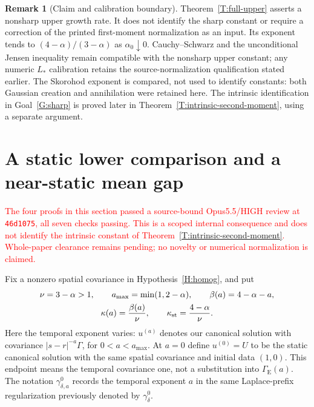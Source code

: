 \documentclass[12pt]{article}
\numberwithin{equation}{section}
\theoremstyle{definition}
\newtheorem{remark}[theorem]{Remark}
\newcommand{\myCmts}[1]{\begin{framed}\noindent\textcolor{red}{#1}\end{framed}}
\begin{document}
\begin{remark}[Claim and calibration boundary]\label{R:full-upper-boundary}
  Theorem~\ref{T:full-upper} asserts a nonsharp upper growth rate.
  It does not identify the sharp constant or require a correction of the
  printed first-moment normalization as an input.
  Its exponent tends to $(4-\alpha)/(3-\alpha)$ as $\alpha_0\downarrow0$.
  Cauchy--Schwarz and the unconditional Jensen inequality remain compatible
  with the nonsharp upper constant; any numeric $L_*$ calibration retains
  the source-normalization qualification stated earlier.
  The Skorohod exponent is compared, not used to identify constants:
  both Gaussian creation and annihilation were retained here.
  The intrinsic identification in Goal~\ref{G:sharp} is proved later in
  Theorem~\ref{T:intrinsic-second-moment}, using a separate argument.
\end{remark}


\section{A static lower comparison and a near-static mean gap}
\label{S:near-static-lower}

\myCmts{The four proofs in this section passed a source-bound Opus5.5/HIGH
review at \texttt{46d1075}, all seven checks passing. This is a scoped
internal consequence and does not identify the intrinsic constant of
Theorem~\ref{T:intrinsic-second-moment}. Whole-paper clearance remains
pending; no novelty or numerical normalization is claimed.}

Fix a nonzero spatial covariance in Hypothesis~\ref{H:homog}, and put
\[
  \begin{gathered}
    \nu=3-\alpha>1,\qquad a_{\max}=\min(1,2-\alpha),\qquad
    \beta(a)=4-\alpha-a,\\
    \kappa(a)=\frac{\beta(a)}\nu,\qquad
    \kappa_{\rm st}=\frac{4-\alpha}\nu.
  \end{gathered}
\]
Here the temporal exponent varies: $u^{(a)}$ denotes our canonical solution
with covariance $|s-r|^{-a}\Gamma$, for $0<a<a_{\max}$.
At $a=0$ define $u^{(0)}=U$ to be the static canonical solution with the
same spatial covariance and initial data $(1,0)$. This endpoint means the
temporal covariance one, not a substitution into $\Gamma_{\mathrm E}(a)$.
The notation $\gamma_{\delta,a}^0$ records the temporal exponent $a$
in the same Laplace-prefix regularization previously denoted by
$\gamma_\delta^0$.
\end{document}
